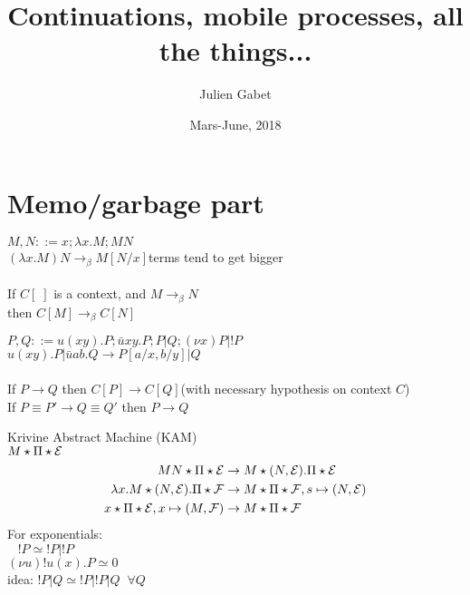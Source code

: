 \documentclass[a4paper,12pt]{book}
\title{Continuations, mobile processes, all the things...}
\author{Julien Gabet}
\date{Mars-June, 2018}
\begin{document}
\everymath{\displaystyle}

\maketitle

\chapter*{Memo/garbage part}

\noindent$M,N::= x ; \lambda x.M ; MN$\\
$(\lambda x.M)N \rightarrow_\beta M[N/x]$\hfill terms tend to get bigger\\
~\\
If $C[\;]$ is a context, and $M\rightarrow_\beta N$\\
\;\; then $C[M]\rightarrow_\beta C[N]$

\noindent\hrulefill

\noindent$P,Q::= u(xy).P ; \bar{u}xy.P ; P|Q ; (\nu x)P | !P$\\
$u(xy).P | \bar{u}ab.Q \rightarrow P[a/x,b/y] | Q$\\
~\\
If $P\rightarrow Q$ then $C[P]\rightarrow C[Q]$\hfill (with necessary hypothesis on context $C$)\\
If $P\equiv P'\rightarrow Q\equiv Q'$ then $P\rightarrow Q$

\noindent\hrulefill

\noindent Krivine Abstract Machine (KAM)\\
$M\star\Pi\star\mathcal{E}$\\
\begin{align*}
MN\star\Pi\star\mathcal{E} &\rightarrow M\star(N,\mathcal{E}).\Pi\star\mathcal{E}\\
\lambda x.M\star(N,\mathcal{E}).\Pi\star\mathcal{F} &\rightarrow M\star\Pi\star\mathcal{F},s\mapsto(N,\mathcal{E})\\
x\star\Pi\star\mathcal{E},x\mapsto(M,\mathcal{F}) &\rightarrow M\star\Pi\star\mathcal{F}
\end{align*}
For exponentials:\\
$\;\;\;!P\simeq!P|!P$\\
$(\nu u)!u(x).P\simeq 0$\\
idea: $!P|Q\simeq!P|!P|Q \;\; \forall Q$

\noindent\hrulefill
\end{document}
